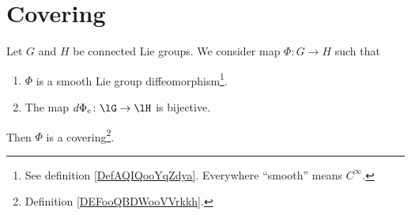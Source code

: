 \section{Covering}

\begin{lemma}
    Let \( G\) and \( H\) be connected Lie groups. We consider map \( \Phi\colon G\to H\) such that
    \begin{enumerate}
        \item
            \( \Phi\) is a smooth Lie group diffeomorphism\footnote{See definition \ref{DefAQIQooYqZdya}. Everywhere ``smooth'' means \(  C^{\infty}\).}.
             \item
                 The map \( d\Phi_e\colon \lG\to \lH\) is bijective.
    \end{enumerate}
    Then \( \Phi\) is a covering\footnote{Definition \ref{DEFooQBDWooVVrkkh}.}.
\end{lemma}

